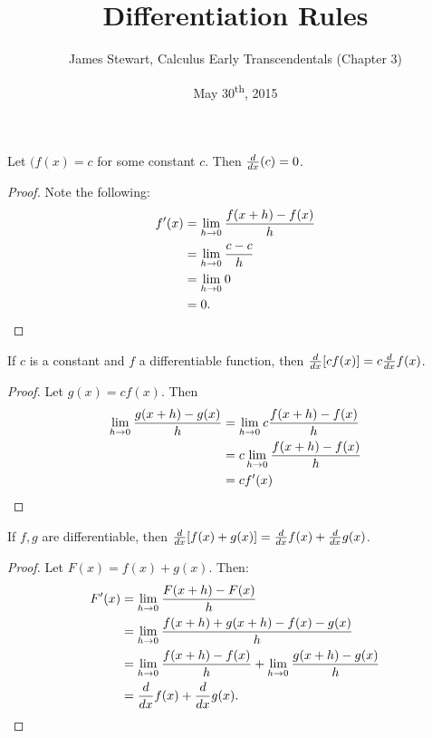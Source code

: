 \documentclass[a4paper,11pt]{article}
\title{Differentiation Rules}
\author{James Stewart, Calculus Early Transcendentals (Chapter 3)}
\date{May 30\textsuperscript{th}, 2015}
\begin{document}
\maketitle
{}

\begin{outline}

    Let \((f(x)=c\) for some constant \(c\). Then \(\frac{d}{dx}(c) = 0\).
    
    \begin{proof}
      Note the following:
      \begin{align*}
        f'(x) &= \lim\limits_{h\rightarrow 0^{}}\frac{f(x+h)-f(x)}{h}\\
              &= \lim\limits_{h\rightarrow 0^{}}\frac{c-c}{h}        \\
              &= \lim\limits_{h\rightarrow 0^{}}0                    \\
              &= 0\text{.}
      \end{align*}
    \end{proof}
    
    If \(c\) is a constant and \(f\) a differentiable function, then \(\frac{d}{dx}[cf(x)] = c\frac{d}{dx}f(x)\).
    
    \begin{proof}
      Let \(g(x) = cf(x)\). Then 
      \begin{align*}
        \lim\limits_{h\rightarrow 0^{}} \frac{g(x+h)-g(x)}{h} &= \lim\limits_{h\rightarrow 0^{}} c\frac{f(x+h)-f(x)}{h}\\
                                            &= c \lim\limits_{h\rightarrow 0^{}}\frac{f(x+h)-f(x)}{h}\\
                                            &= cf'(x)
      \end{align*}
    \end{proof}
    
    If \(f, g\) are differentiable, then \(\frac{d}{dx}[f(x)+g(x)] = \frac{d}{dx}f(x) + \frac{d}{dx}g(x)\).
    
    \begin{proof}
      Let \(F(x) = f(x) + g(x)\). Then:
      \begin{align*}
        F'(x) &= \lim\limits_{h\rightarrow 0^{}}\frac{F(x+h)-F(x)}{h}\\
              &= \lim\limits_{h\rightarrow 0^{}}\frac{f(x+h)+g(x+h)-f(x)-g(x)}{h}\\
              &= \lim\limits_{h\rightarrow 0^{}}\frac{f(x+h)-f(x)}{h} + \lim\limits_{h\rightarrow 0^{}}\frac{g(x+h)-g(x)}{h}\\
              &= \frac{d}{dx}f(x) + \frac{d}{dx}g(x)\text{.}
      \end{align*}
    \end{proof}
    

\end{outline}
\end{document}
